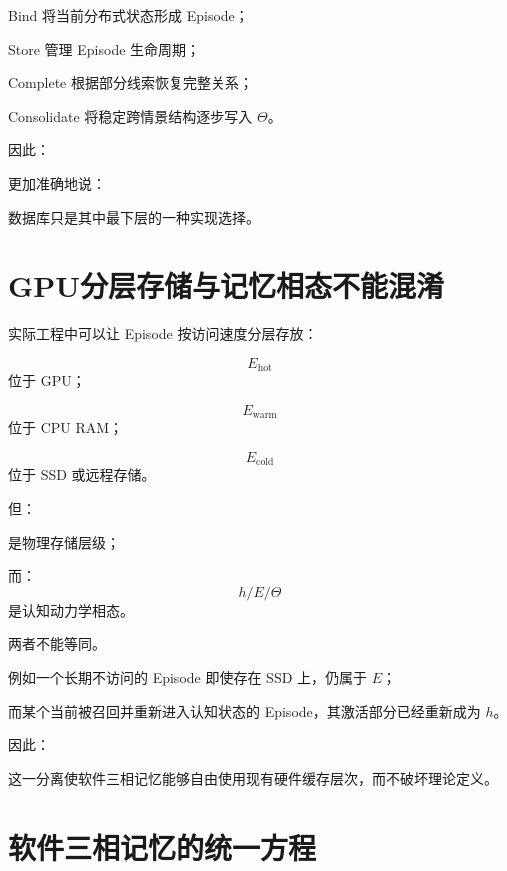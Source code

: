 Bind 将当前分布式状态形成 Episode；

Store 管理 Episode 生命周期；

Complete 根据部分线索恢复完整关系；

Consolidate 将稳定跨情景结构逐步写入 $\Theta$。

因此：
\begin{statementbox}
\centering
{}
\end{statementbox}

更加准确地说：
\begin{statementbox}
\centering
{}
\end{statementbox}

数据库只是其中最下层的一种实现选择。

\section{GPU分层存储与记忆相态不能混淆}

实际工程中可以让 Episode 按访问速度分层存放：

\[
E_{\mathrm{hot}}
\]
位于 GPU；

\[
E_{\mathrm{warm}}
\]
位于 CPU RAM；

\[
E_{\mathrm{cold}}
\]
位于 SSD 或远程存储。

但：
\begin{statementbox}
\centering
{}
\end{statementbox}
是物理存储层级；

而：
\[
\boxed{
h/E/\Theta
}
\]
是认知动力学相态。

两者不能等同。

例如一个长期不访问的 Episode 即使存在 SSD 上，仍属于 $E$；

而某个当前被召回并重新进入认知状态的 Episode，其激活部分已经重新成为 $h$。

因此：
\begin{statementbox}
\centering
{}
\end{statementbox}

这一分离使软件三相记忆能够自由使用现有硬件缓存层次，而不破坏理论定义。

\section{软件三相记忆的统一方程}

